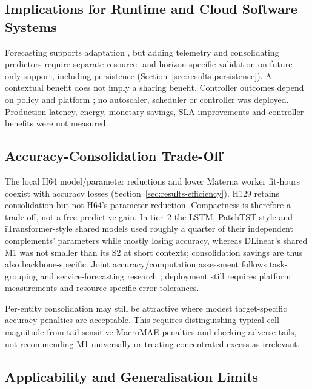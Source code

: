 \documentclass[5p,twocolumn]{elsarticle}
\begin{document}
\subsection{Implications for Runtime and Cloud Software Systems}
\label{sec:discussion-systems}

Forecasting supports adaptation \citep{Taherizadeh2018Monitoring,Bauer2020SelfAware},
but adding telemetry and consolidating predictors require separate resource-
and horizon-specific validation on future-only support, including persistence
(Section~\ref{sec:results-persistence}). A contextual benefit does not imply a
sharing benefit. Controller outcomes depend on policy and platform
\citep{Qu2018Autoscaling}; no autoscaler, scheduler or controller was deployed.
Production latency, energy, monetary savings, SLA improvements and controller
benefits were not measured.

\subsection{Accuracy-Consolidation Trade-Off}
\label{sec:discussion-efficiency}

The local H64 model/parameter reductions and lower Materna worker fit-hours
coexist with accuracy losses (Section~\ref{sec:results-efficiency}).
H129 retains consolidation but not H64's parameter reduction. Compactness is
therefore a trade-off, not a free predictive gain. In tier~2 the LSTM,
PatchTST-style and iTransformer-style shared models used roughly a quarter
of their independent complements' parameters while mostly losing accuracy,
whereas DLinear's shared M1 was not smaller than its S2 at short contexts;
consolidation savings are thus also backbone-specific. Joint accuracy/computation
assessment follows task-grouping and service-forecasting research
\citep{Standley2020TaskGrouping,Syu2017DynamicQoS}; deployment still requires
platform measurements and resource-specific error tolerances.

Per-entity consolidation may still be attractive where modest target-specific
accuracy penalties are acceptable. This requires distinguishing typical-cell
magnitude from tail-sensitive MacroMAE penalties and checking adverse tails,
not recommending M1 universally or treating concentrated excess as irrelevant.

\subsection{Applicability and Generalisation Limits}
\label{sec:discussion-applicability}
\end{document}
